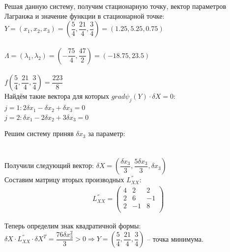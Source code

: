 \documentclass[14pt,a4paper,fleqn]{extarticle}
\begin{document}
	Решая данную систему, получим стационарную точку, вектор параметров Лагранжа и значение функции в стационарной точке:\\
	
	$Y = (x_1, x_2, x_3) = (\dfrac{5}{4}, \dfrac{21}{4}, \dfrac{3}{4}) = (1.25, 5.25, 0.75)$\\\\
	$\Lambda = (\lambda_1, \lambda_2) = (-\dfrac{75}{4}, \dfrac{47}{2}) = (-18.75, 23.5)$\\\\
	$f(\dfrac{5}{4}, \dfrac{21}{4}, \dfrac{3}{4}) = \dfrac{223}{8}$\\
	
	Найдём такие вектора для которых $grad \psi_j (Y) \cdot \delta X = 0$:\\
	$j = 1: 2\delta x_1 - \delta x_2 + \delta x_3 = 0$\\
	$j = 2: \delta x_1 - 2\delta x_2 + 3\delta x_3 = 0$
	
	\newpage
	
	Решим систему приняв $\delta x_3$ за параметр:\\
	
	\\\\
	
	Получили следующий вектор: $\delta X = (\dfrac{\delta x_3}{3}, \dfrac{5 \delta x_3}{3}, \delta x_3)$\\
	Составим матрицу вторых производных $L^{''}_{XX}$:
	\begin{align*}
		L^{''}_{XX} = \begin{pmatrix}
			4 & 2 & 2\\
			2 & 6 & -1\\
			2 & -1 & 8\\
		\end{pmatrix}
	\end{align*}

	Теперь определим знак квадратичной формы:\\
	$\delta X \cdot L^{''}_{XX} \cdot \delta X^T = \dfrac{76\delta x^2_3}{3} > 0 \Rightarrow Y = (\dfrac{5}{4}, \dfrac{21}{4}, \dfrac{3}{4})$ -- точка минимума.\\
	
\end{document}
